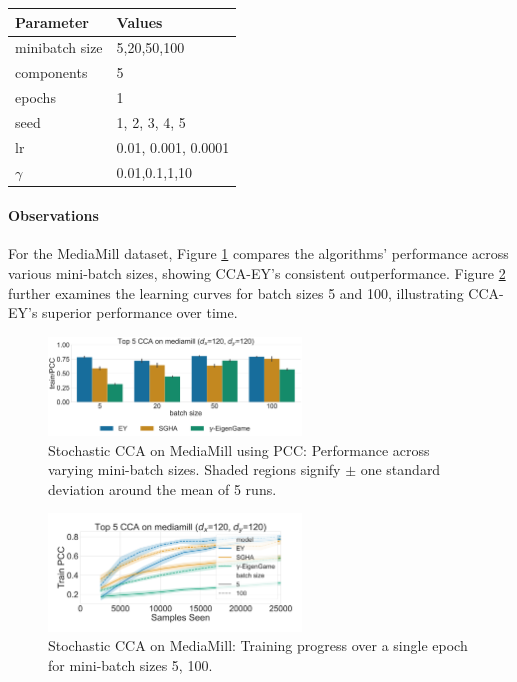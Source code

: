 \begin{table}[h!]
    \centering
    \begin{tabular}{|l|l|}
        \hline Parameter             & Values              \\
        \hline minibatch size        & 5,20,50,100         \\
        \hline components            & 5                   \\
        \hline epochs                & 1                   \\
        \hline seed                  & 1, 2, 3, 4, 5       \\
        \hline lr                    & 0.01, 0.001, 0.0001 \\
        \hline $\gamma$\footnotemark & 0.01,0.1,1,10       \\
        \hline
    \end{tabular}
    \label{tab:hyperparameters}
\end{table}

\paragraph{Observations}
For the MediaMill dataset, Figure \ref{fig:corr_mediamill} compares the algorithms' performance across various mini-batch sizes, showing CCA-EY's consistent outperformance. Figure \ref{fig:learningcurve_mediamill} further examines the learning curves for batch sizes 5 and 100, illustrating CCA-EY's superior performance over time.

\begin{figure}
    \centering
    \includegraphics[width=0.6\textwidth]{figures/CCA/mediamill_models_different_batch_sizes}
    \caption{Stochastic CCA on MediaMill using PCC: Performance across varying mini-batch sizes. Shaded regions signify \(\pm\) one standard deviation around the mean of 5 runs.}
    \label{fig:corr_mediamill}
\end{figure}

\begin{figure}
    \centering
    \includegraphics[width=0.6\textwidth]{figures/CCA/mediamill_allbatchsizes_pcc}
    \caption{Stochastic CCA on MediaMill: Training progress over a single epoch for mini-batch sizes 5, 100.}
    \label{fig:learningcurve_mediamill}
\end{figure}

